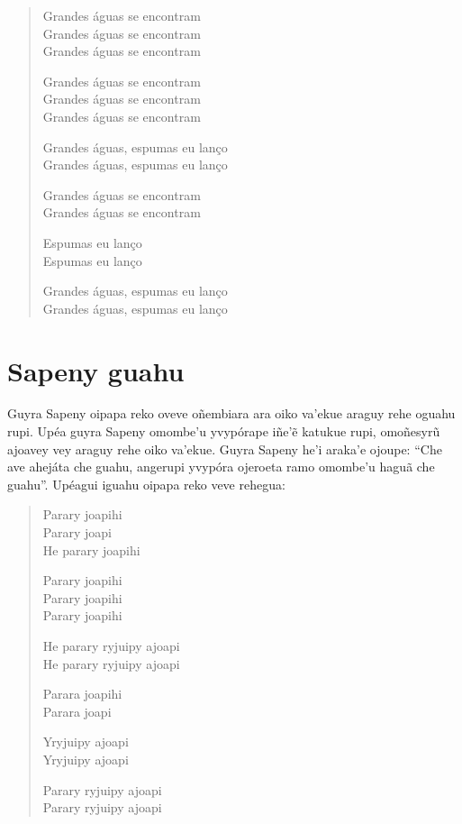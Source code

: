 \begin{verse}
Grandes águas se encontram\\
Grandes águas se encontram\\
Grandes águas se encontram

Grandes águas se encontram\\
Grandes águas se encontram\\
Grandes águas se encontram

Grandes águas, espumas eu lanço\\
Grandes águas, espumas eu lanço

Grandes águas se encontram\\
Grandes águas se encontram

Espumas eu lanço\\
Espumas eu lanço

Grandes águas, espumas eu lanço\\
Grandes águas, espumas eu lanço
\end{verse}

\chapter{Sapeny guahu}

Guyra Sapeny oipapa reko oveve oñembiara ara oiko va'ekue araguy rehe
oguahu rupi. Upéa guyra Sapeny omombe'u yvypórape iñe'ẽ katukue rupi,
omoñesyrũ ajoavey vey araguy rehe oiko va'ekue. Guyra Sapeny he'i
araka'e ojoupe: ``Che ave ahejáta che guahu, angerupi yvypóra ojeroeta
ramo omombe'u haguã che guahu''. Upéagui iguahu oipapa reko veve
rehegua:

\begin{verse}
Parary joapihi\\
Parary joapi\\
He parary joapihi

Parary joapihi\\
Parary joapihi\\
Parary joapihi

He parary ryjuipy ajoapi\\
He parary ryjuipy ajoapi

Parara joapihi\\
Parara joapi

Yryjuipy ajoapi\\
Yryjuipy ajoapi

Parary ryjuipy ajoapi\\
Parary ryjuipy ajoapi
\end{verse}


